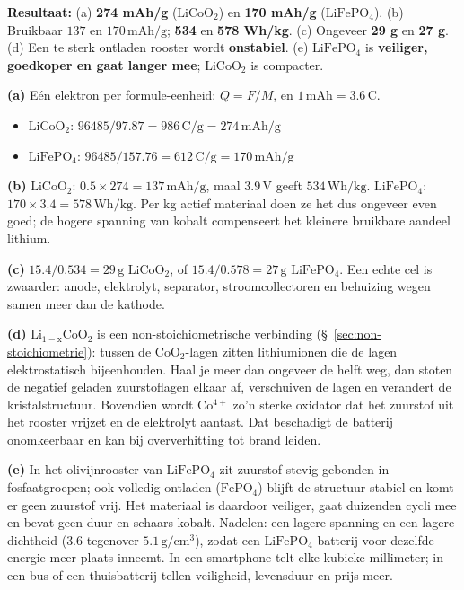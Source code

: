 \begin{oplossing}
\textbf{Resultaat:} (a) \textbf{274 mAh/g} (\(\mathrm{LiCoO_2}\)) en \textbf{170 mAh/g} (\(\mathrm{LiFePO_4}\)). (b) Bruikbaar \(137\) en \(170\,\mathrm{mAh/g}\); \textbf{534} en \textbf{578 Wh/kg}. (c) Ongeveer \textbf{29 g} en \textbf{27 g}. (d) Een te sterk ontladen rooster wordt \textbf{onstabiel}. (e) \(\mathrm{LiFePO_4}\) is \textbf{veiliger, goedkoper en gaat langer mee}; \(\mathrm{LiCoO_2}\) is compacter.

\textbf{(a)} Eén elektron per formule-eenheid: \(Q = F/M\), en \(1\,\mathrm{mAh} = 3.6\,\mathrm{C}\).

\begin{itemize}
\item
  \(\mathrm{LiCoO_2}\): \(96485/97.87 = 986\,\mathrm{C/g} = 274\,\mathrm{mAh/g}\)
\item
  \(\mathrm{LiFePO_4}\): \(96485/157.76 = 612\,\mathrm{C/g} = 170\,\mathrm{mAh/g}\)
\end{itemize}

\textbf{(b)} \(\mathrm{LiCoO_2}\): \(0.5 \times 274 = 137\,\mathrm{mAh/g}\), maal \(3.9\,\mathrm{V}\) geeft \(534\,\mathrm{Wh/kg}\). \(\mathrm{LiFePO_4}\): \(170 \times 3.4 = 578\,\mathrm{Wh/kg}\). Per kg actief materiaal doen ze het dus ongeveer even goed; de hogere spanning van kobalt compenseert het kleinere bruikbare aandeel lithium.

\textbf{(c)} \(15.4/0.534 = 29\,\mathrm{g}\) \(\mathrm{LiCoO_2}\), of \(15.4/0.578 = 27\,\mathrm{g}\) \(\mathrm{LiFePO_4}\). Een echte cel is zwaarder: anode, elektrolyt, separator, stroomcollectoren en behuizing wegen samen meer dan de kathode.

\textbf{(d)} \(\mathrm{Li_{1-x}CoO_2}\) is een non-stoichiometrische verbinding (\S~\ref{sec:non-stoichiometrie}): tussen de \(\mathrm{CoO_2}\)-lagen zitten lithiumionen die de lagen elektrostatisch bijeenhouden. Haal je meer dan ongeveer de helft weg, dan stoten de negatief geladen zuurstoflagen elkaar af, verschuiven de lagen en verandert de kristalstructuur. Bovendien wordt \(\mathrm{Co^{4+}}\) zo'n sterke oxidator dat het zuurstof uit het rooster vrijzet en de elektrolyt aantast. Dat beschadigt de batterij onomkeerbaar en kan bij oververhitting tot brand leiden.

\textbf{(e)} In het olivijnrooster van \(\mathrm{LiFePO_4}\) zit zuurstof stevig gebonden in fosfaatgroepen; ook volledig ontladen (\(\mathrm{FePO_4}\)) blijft de structuur stabiel en komt er geen zuurstof vrij. Het materiaal is daardoor veiliger, gaat duizenden cycli mee en bevat geen duur en schaars kobalt. Nadelen: een lagere spanning en een lagere dichtheid (\(3.6\) tegenover \(5.1\,\mathrm{g/cm^3}\)), zodat een \(\mathrm{LiFePO_4}\)-batterij voor dezelfde energie meer plaats inneemt. In een smartphone telt elke kubieke millimeter; in een bus of een thuisbatterij tellen veiligheid, levensduur en prijs meer.
\end{oplossing}


